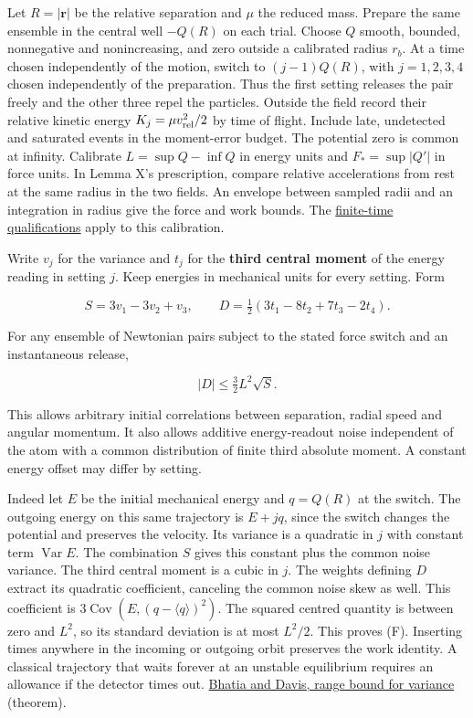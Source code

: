 \documentclass[11pt,a4paper]{article}
\begin{document}
Let \(R=|\mathbf r|\) be the relative separation and \(\mu\) the reduced
mass. Prepare the same ensemble in the central well \(-Q(R)\) on each
trial. Choose \(Q\) smooth, bounded, nonnegative and nonincreasing, and
zero outside a calibrated radius \(r_b\). At a time chosen independently
of the motion, switch to \((j-1)Q(R)\), with \(j=1,2,3,4\) chosen
independently of the preparation. Thus the first setting releases the
pair freely and the other three repel the particles. Outside the field
record their relative kinetic energy \(K_j=\mu v_{\rm rel}^2/2\) by time
of flight. Include late, undetected and saturated events in the
moment-error budget. The potential zero is common at infinity. Calibrate
\(L=\sup Q-\inf Q\) in energy units and \(F_*=\sup|Q'|\) in force units.
In Lemma X's prescription, compare relative accelerations from rest at
the same radius in the two fields. An envelope between sampled radii and
an integration in radius give the force and work bounds. The
\hyperref[lemma-x-and-the-measurement-of-initial-force]{finite-time
qualifications} apply to this calibration.

Write \(v_j\) for the variance and \(t_j\) for the \textbf{third central
moment} of the energy reading in setting \(j\). Keep energies in
mechanical units for every setting. Form

\[
 S=3v_1-3v_2+v_3,\qquad
 D=\tfrac12(3t_1-8t_2+7t_3-2t_4).
\]

For any ensemble of Newtonian pairs subject to the stated force switch
and an instantaneous release,

\[
                  |D|\le \tfrac32 L^2\sqrt S.                   \tag{F}
\]

This allows arbitrary initial correlations between separation, radial
speed and angular momentum. It also allows additive energy-readout noise
independent of the atom with a common distribution of finite third
absolute moment. A constant energy offset may differ by setting.

Indeed let \(E\) be the initial mechanical energy and \(q=Q(R)\) at the
switch. The outgoing energy on this same trajectory is \(E+jq\), since
the switch changes the potential and preserves the velocity. Its
variance is a quadratic in \(j\) with constant term
\(\operatorname{Var}E\). The combination \(S\) gives this constant plus
the common noise variance. The third central moment is a cubic in \(j\).
The weights defining \(D\) extract its quadratic coefficient, canceling
the common noise skew as well. This coefficient is
\(3\operatorname{Cov}(E,(q-\langle q\rangle)^2)\). The squared centred
quantity is between zero and \(L^2\), so its standard deviation is at
most \(L^2/2\). This proves (F). Inserting times anywhere in the
incoming or outgoing orbit preserves the work identity. A classical
trajectory that waits forever at an unstable equilibrium requires an
allowance if the detector times out.
\href{https://doi.org/10.1080/00029890.2000.12005203}{Bhatia and Davis,
range bound for variance} (theorem).
\end{document}
